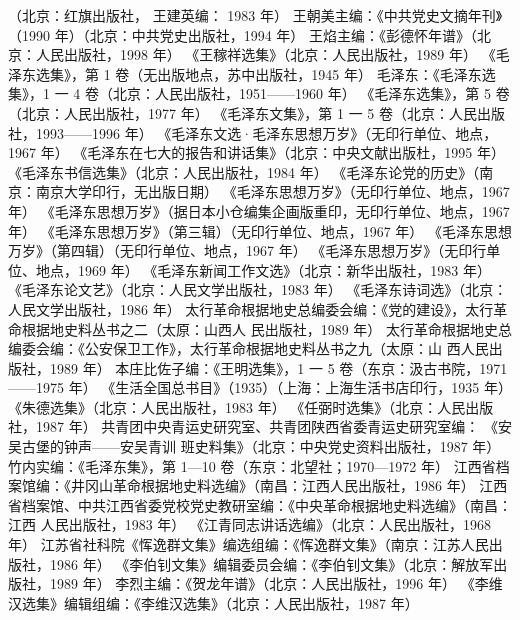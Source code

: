 \begin{thebibliography}{999}
（北京：红旗出版社，
王建英编：
1983 年）
\bibitem{} 王朝美主编：《中共党史文摘年刊》（1990 年）（北京：中共党史出版社，1994 年）
\bibitem{} 王焰主编：《彭德怀年谱》（北京：人民出版社，1998 年）
\bibitem{} 《王稼祥选集》（北京：人民出版社，1989 年）
\bibitem{} 《毛泽东选集》，第 1 卷（无出版地点，苏中出版社，1945 年）
\bibitem{} 毛泽东：《毛泽东选集》，1 一 4 卷（北京：人民出版社，1951——1960 年）
\bibitem{} 《毛泽东选集》，第 5 卷（北京：人民出版社，1977 年）
\bibitem{} 《毛泽东文集》，第 1 一 5 卷（北京：人民出版社，1993——1996 年）
\bibitem{} 《毛泽东文选·毛泽东思想万岁》（无印行单位、地点，1967 年）
\bibitem{} 《毛泽东在七大的报告和讲话集》（北京：中央文献出版杜，1995 年）
\bibitem{} 《毛泽东书信选集》（北京：人民出版社，1984 年）
\bibitem{} 《毛泽东论党的历史》（南京：南京大学印行，无出版日期）
\bibitem{} 《毛泽东思想万岁》（无印行单位、地点，1967 年）
\bibitem{} 《毛泽东思想万岁》（据日本小仓编集企画版重印，无印行单位、地点，1967 年）
\bibitem{} 《毛泽东思想万岁》（第三辑）（无印行单位、地点，1967 年）
\bibitem{} 《毛泽东思想万岁》（第四辑）（无印行单位、地点，1967 年）
\bibitem{} 《毛泽东思想万岁》（无印行单位、地点，1969 年）
\bibitem{} 《毛泽东新闻工作文选》（北京：新华出版社，1983 年）
\bibitem{} 《毛泽东论文艺》（北京：人民文学出版社，1983 年）
\bibitem{} 《毛泽东诗词选》（北京：人民文学出版社，1986 年）
\bibitem{} 太行革命根据地史总编委会编：《党的建设》，太行革命根据地史料丛书之二（太原：山西人
民出版社，1989 年）
\bibitem{} 太行革命根据地史总编委会编：《公安保卫工作》，太行革命根据地史料丛书之九（太原：山
西人民出版社，1989 年）
\bibitem{} 本庄比佐子编：《王明选集》，1 一 5 卷（东京：汲古书院，1971——1975 年）
\bibitem{} 《生活全国总书目》（1935）（上海：上海生活书店印行，1935 年）
\bibitem{} 《朱德选集》（北京：人民出版社，1983 年）
\bibitem{} 《任弼时选集》（北京：人民出版社，1987 年）
\bibitem{} 共青团中央青运史研究室、共青团陕西省委青运史研究室编：
\bibitem{} 《安吴古堡的钟声——安吴青训
班史料集》（北京：中央党史资料出版社，1987 年）
\bibitem{} 竹内实编：《毛泽东集》，第 1—10 卷（东京：北望社；1970—1972 年）
\bibitem{} 江西省档案馆编：《井冈山革命根据地史料选编》（南昌：江西人民出版社，1986 年）
\bibitem{} 江西省档案馆、中共江西省委党校党史教研室编：《中央革命根据地史料选编》（南昌：江西
人民出版社，1983 年）
\bibitem{} 《江青同志讲话选编》（北京：人民出版社，1968 年）
\bibitem{} 江苏省社科院《恽逸群文集》编选组编：《恽逸群文集》（南京：江苏人民出版社，1986 年）
\bibitem{} 《李伯钊文集》编辑委员会编：《李伯钊文集》（北京：解放军出版社，1989 年）
\bibitem{} 李烈主编：《贺龙年谱》（北京：人民出版社，1996 年）
\bibitem{} 《李维汉选集》编辑组编：《李维汉选集》（北京：人民出版社，1987 年）

\end{thebibliography}
